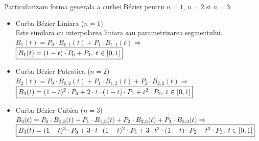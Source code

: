 \documentclass{article}
\begin{document}
\tab Particularizam forma generala a curbei B\'ezier pentru $n=1$, $n=2$ si $n=3$: 
\begin{itemize}
    \item Curba B\'ezier Liniara ($n=1$)  \\
    Este similara cu interpolarea liniara sau parametrizarea segmentului.\\
    $B_1(t) = P_0 \cdot B_{0,1}(t) + P_1 \cdot B_{1,1}(t) \Rightarrow$ $\framebox{$B_1(t) = (1-t) \cdot P_0 + P_1,\; t \in [0, 1]$}$ \\
    
    \item Curba B\'ezier Patratica ($n=2$)
     \\
    $B_2(t) = P_0 \cdot B_{0,2}(t) + P_1 \cdot B_{1,2}(t) + P_2 \cdot B_{2,2}(t) \Rightarrow$ 
    $\framebox{$B_2(t) = (1-t)^2 \cdot P_0 + 2\cdot t \cdot (1-t) \cdot P_1 + t^2 \cdot P_2,\; t \in [0, 1]$}$ \\
    
    \item Curba B\'ezier Cubica ($n=3$)
     \\
    $B_3(t) = P_0 \cdot B_{0,3}(t) + P_1 \cdot B_{1,3}(t) + P_2 \cdot B_{2,3}(t) + P_3 \cdot B_{3,3}(t) \\ \Rightarrow$ 
    $\framebox{$B_3(t) = (1-t)^3 \cdot P_0 + 3\cdot t \cdot (1-t)^2 \cdot P_1 + 3 \cdot t^2 \cdot (1-t) \cdot P_2 + t^3 \cdot P_3,\; t \in [0, 1]$}$ \\
    
\end{itemize}
\end{document}

